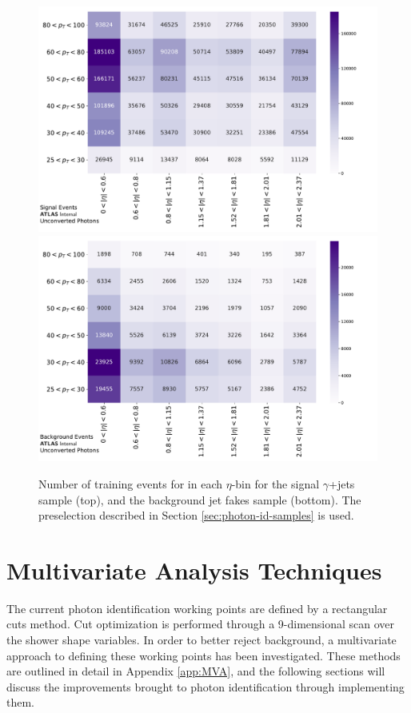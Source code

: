 \begin{figure}[!thp]
    \centering
    \includegraphics[width=.85\textwidth]{chapters/chapter4_photonID/images/sig_events.pdf}
    \includegraphics[width=.85\textwidth]{chapters/chapter4_photonID/images/bkg_events.pdf}
    \caption[Number of training events for in each $\eta$-\pt bin for the signal $\gamma$+jets sample, and the background jet fakes sample]{Number of training events for in each $\eta$-\pt bin for the signal $\gamma$+jets sample (top), and the background jet fakes sample (bottom). The preselection described in Section \ref{sec:photon-id-samples} is used.}
    \label{fig:photonid-events}
\end{figure}


\section{Multivariate Analysis Techniques}

The current photon identification working points are defined by a rectangular cuts method. Cut optimization is performed through a 9-dimensional scan over the shower shape variables. In order to better reject background, a multivariate approach to defining these working points has been investigated. These methods are outlined in detail in Appendix \ref{app:MVA}, and the following sections will discuss the improvements brought to photon identification through implementing them.

